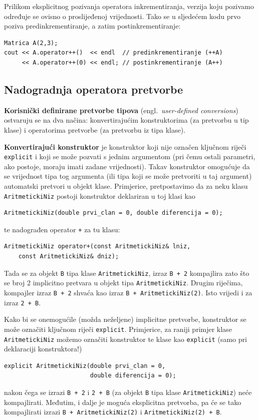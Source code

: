 Prilikom eksplicitnog pozivanja operatora inkrementiranja,
verzija koju pozivamo određuje se ovisno o proslijeđenoj vrijednosti.
Tako se u sljedećem kodu prvo poziva predinkrementiranje,
a zatim postinkrementiranje:

\begin{verbatim}
Matrica A(2,3);
cout << A.operator++()  << endl  // predinkrementiranje (++A)
     << A.operator++(0) << endl; // postinkrementiranje (A++)
\end{verbatim}


\subsection{Nadogradnja operatora pretvorbe}

\textbf{Korisnički definirane pretvorbe tipova}  
(engl.\ \textit{user-defined conversions})
ostvaruju se na dva načina:
konvertirajućim konstruktorima (za pretvorbu u tip klase)
i operatorima pretvorbe (za pretvorbu iz tipa klase).
\medskip

\textbf{Konvertirajući konstruktor} je konstruktor koji nije označen ključnom riječi \texttt{explicit} 
i koji se može pozvati s jednim argumentom
(pri čemu ostali parametri, ako postoje, moraju imati zadane vrijednosti).
Takav konstruktor omogućuje da se vrijednost tipa tog argumenta
(ili tipa koji se može pretvoriti u taj argument)
automatski pretvori u objekt klase.
Primjerice,
pretpostavimo da za neku klasu \texttt{AritmetickiNiz} postoji konstruktor deklariran u toj klasi kao
\begin{verbatim}
AritmetickiNiz(double prvi_clan = 0, double diferencija = 0);
\end{verbatim}
te nadograđen operator \texttt{+} za tu klasu:
\begin{verbatim}
AritmetickiNiz operator+(const AritmetickiNiz& lniz,
    const AritmetickiNiz& dniz);
\end{verbatim}
Tada se za objekt \texttt{B} tipa klase \texttt{AritmetickiNiz}, izraz \texttt{B + 2}
kompajlira zato što se broj 2 implicitno pretvara u objekt tipa \texttt{AritmetickiNiz}.
Drugim riječima, kompajler izraz \texttt{B + 2} shvaća kao
izraz \texttt{B + AritmetickiNiz(2)}.
Isto vrijedi i za izraz \texttt{2 + B}.
\medskip

Kako bi se onemogućile (možda neželjene) implicitne pretvorbe,
konstruktor se može označiti ključnom riječi \texttt{explicit}.
Primjerice, za raniji primjer klase \texttt{AritmetickiNiz}
možemo označiti konstruktor te klase kao \texttt{explicit}
(samo pri deklaraciji konstruktora!)
\begin{verbatim}
explicit AritmetickiNiz(double prvi_clan = 0, 
                        double diferencija = 0);
\end{verbatim}
nakon čega se izrazi \texttt{B + 2} i \texttt{2 + B}
(za objekt \texttt{B} tipa klase \texttt{AritmetickiNiz})
neće kompajlirati.
Međutim, i dalje je moguća eksplicitna pretvorba,
pa će se tako kompajlirati izrazi \texttt{B + AritmetickiNiz(2)}
i \texttt{AritmetickiNiz(2) + B}.
\medskip

